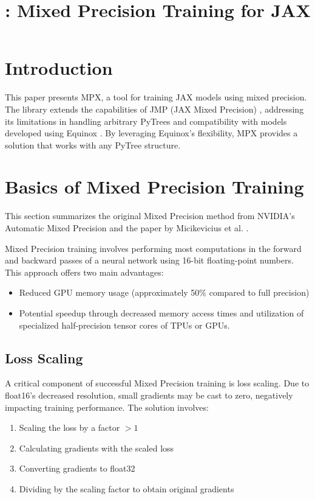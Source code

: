 \documentclass[11pt,a4paper]{article}
\title{\mpx{}: Mixed Precision Training for JAX}
\author{}
\date{}
\newcommand{\mpx}{\textsc{MPX}}
\begin{document}
\maketitle

\section{Introduction}
This paper presents \mpx{}, a tool for training JAX models using mixed precision. The library extends the capabilities of JMP (JAX Mixed Precision) \cite{jmp}, addressing its limitations in handling arbitrary PyTrees and compatibility with models developed using Equinox \cite{kidger2021equinox}. By leveraging Equinox's flexibility, \mpx{} provides a solution that works with any PyTree structure.

\section{Basics of Mixed Precision Training}
This section summarizes the original Mixed Precision method from NVIDIA's Automatic Mixed Precision \cite{nvidia_amp} and the paper by Micikevicius et al. \cite{mixed_precision_paper}.

Mixed Precision training involves performing most computations in the forward and backward passes of a neural network using 16-bit floating-point numbers. This approach offers two main advantages:
\begin{itemize}
    \item Reduced GPU memory usage (approximately 50\% compared to full precision)
    \item Potential speedup through decreased memory access times and utilization of specialized half-precision tensor cores of TPUs or GPUs.
\end{itemize}

\subsection{Loss Scaling}
A critical component of successful Mixed Precision training is loss scaling. Due to float16's decreased resolution, small gradients may be cast to zero, negatively impacting training performance. The solution involves:
\begin{enumerate}
    \item Scaling the loss by a factor $> 1$
    \item Calculating gradients with the scaled loss
    \item Converting gradients to float32
    \item Dividing by the scaling factor to obtain original gradients
\end{enumerate}
\end{document}

